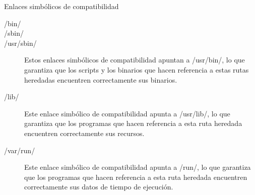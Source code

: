\begin{frame}[c]{Enlaces simbólicos de compatibilidad}
  \begin{description}
    \item [/bin/]
    \item [/sbin/]
    \item [/usr/sbin/] Estos enlaces simbólicos de compatibilidad apuntan a
      /usr/bin/, lo que garantiza que los scripts y los binarios que hacen
      referencia a estas rutas heredadas encuentren correctamente sus binarios.
    \pausa
    \item [/lib/] Este enlace simbólico de compatibilidad apunta a
      /usr/lib/, lo que garantiza que los programas que hacen referencia a
      esta ruta heredada encuentren correctamente sus recursos.
    \pausa
    \item [/var/run/] Este enlace simbólico de compatibilidad apunta a /run/,
      lo que garantiza que los programas que hacen referencia a esta ruta
      heredada encuentren correctamente sus datos de tiempo de ejecución.
  \end{description}
\end{frame}
